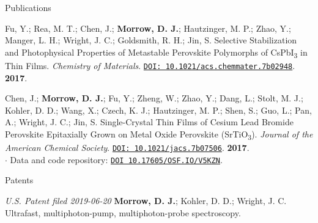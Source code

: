 \documentclass{resume} %
\begin{document}
\begin{rSection}{Publications}
\begin{etaremune}
\item Fu, Y.; Rea, M. T.; Chen, J.; \textbf{Morrow, D. J.}; Hautzinger, M. P.; Zhao, Y.; Manger, L. H.; Wright, J. C.; Goldsmith, R. H.; Jin, S. Selective Stabilization and Photophysical Properties of
Metastable Perovskite Polymorphs of CsPbI\textsubscript{3} in Thin Films. \emph{Chemistry of Materials}. \href{http://pubs.acs.org/doi/10.1021/acs.chemmater.7b02948}{\texttt{DOI: 10.1021/acs.chemmater.7b02948}}. \textbf{2017}. 
 
\item Chen, J.; \textbf{Morrow, D. J.}; Fu, Y.; Zheng, W.; Zhao, Y.; Dang, L.; Stolt, M. J.; Kohler, D. D.; Wang, X.; Czech, K. J.; Hautzinger, M. P.; Shen, S.; Guo, L.; Pan, A.; Wright, J. C.; Jin, S. Single-Crystal Thin Films of Cesium Lead Bromide Perovskite Epitaxially Grown on Metal Oxide Perovskite (SrTiO\textsubscript{3}). \emph{Journal of the American Chemical Society}. \href{http://pubs.acs.org/doi/10.1021/jacs.7b07506}{\texttt{DOI: 10.1021/jacs.7b07506}}. \textbf{2017}. \\
$\cdot$ Data and code repository: \href{https://osf.io/v5kzn/}{\texttt{DOI 10.17605/OSF.IO/V5KZN}}.
	


\end{etaremune}


\end{rSection}

\begin{rSection}{Patents}
	\begin{etaremune}
		\item \textit{U.S. Patent filed 2019-06-20} \textbf{Morrow, D. J.}; Kohler, D. D.; Wright, J. C. Ultrafast, multiphoton-pump, multiphoton-probe spectroscopy. 		
	\end{etaremune}	
\end{rSection}
\end{document}
